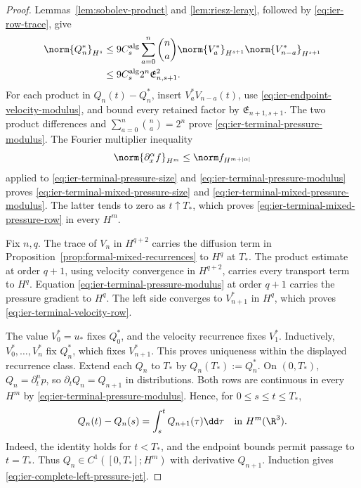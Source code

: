 \begin{proof}
Lemmas~\ref{lem:sobolev-product} and \ref{lem:riesz-leray}, followed by
\eqref{eq:ier-row-trace}, give
\begin{align*}
 \norm{Q_n^*}_{H^s}
 &\le9C_s^{\rm alg}\sum_{a=0}^{n}\binom na
 \norm{V_a^*}_{H^{s+1}}\norm{V_{n-a}^*}_{H^{s+1}}\\
 &\le9C_s^{\rm alg}2^n\mathfrak E_{n,s+1}^2.
\end{align*}
For each product in \(Q_n(t)-Q_n^*\), insert
\(V_a^*V_{n-a}(t)\), use
\eqref{eq:ier-endpoint-velocity-modulus}, and bound every retained factor by
\(\mathfrak E_{n+1,s+1}\).  The two product differences and
\(\sum_{a=0}^{n}\binom na=2^n\) prove
\eqref{eq:ier-terminal-pressure-modulus}.  The Fourier multiplier inequality
\[
 \norm{\partial_x^\alpha f}_{H^m}
 \le\norm f_{H^{m+|\alpha|}}
\]
applied to \eqref{eq:ier-terminal-pressure-size} and
\eqref{eq:ier-terminal-pressure-modulus} proves
\eqref{eq:ier-terminal-mixed-pressure-size} and
\eqref{eq:ier-terminal-mixed-pressure-modulus}.  The latter tends to zero
as \(t\uparrow T_*\), which proves
\eqref{eq:ier-terminal-mixed-pressure-row} in every \(H^m\).

Fix \(n,q\).  The trace of \(V_n\) in \(H^{q+2}\) carries the diffusion
term in Proposition~\ref{prop:formal-mixed-recurrences} to \(H^q\) at
\(T_*\).  The product estimate at order \(q+1\), using velocity convergence
in \(H^{q+2}\), carries every transport term to \(H^q\).  Equation
\eqref{eq:ier-terminal-pressure-modulus} at order \(q+1\) carries the pressure
gradient to \(H^q\).  The left side converges to \(V_{n+1}^*\) in \(H^q\),
which proves \eqref{eq:ier-terminal-velocity-row}.

The value \(V_0^*=u_*\) fixes \(Q_0^*\), and the velocity recurrence fixes
\(V_1^*\).  Inductively, \(V_0^*,\ldots,V_n^*\) fix \(Q_n^*\), which fixes
\(V_{n+1}^*\).  This proves uniqueness within the displayed recurrence
class.  Extend each \(Q_n\) to \(T_*\) by
\(Q_n(T_*):=Q_n^*\).  On \((0,T_*)\),
\(Q_n=\partial_t^np\), so \(\partial_tQ_n=Q_{n+1}\) in distributions.
Both rows are continuous in every \(H^m\) by
\eqref{eq:ier-terminal-pressure-modulus}.  Hence, for
\(0\le s\le t\le T_*\),
\begin{equation}
 Q_n(t)-Q_n(s)=\int_s^tQ_{n+1}(\tau)\dd\tau
 \quad\text{in }H^m(\R^3).
 \label{eq:ier-pressure-banach-identity}
\end{equation}
Indeed, the identity holds for \(t<T_*\), and the endpoint bounds permit
passage to \(t=T_*\).  Thus
\(Q_n\in C^1([0,T_*];H^m)\) with derivative \(Q_{n+1}\).  Induction gives
\eqref{eq:ier-complete-left-pressure-jet}.
\end{proof}

